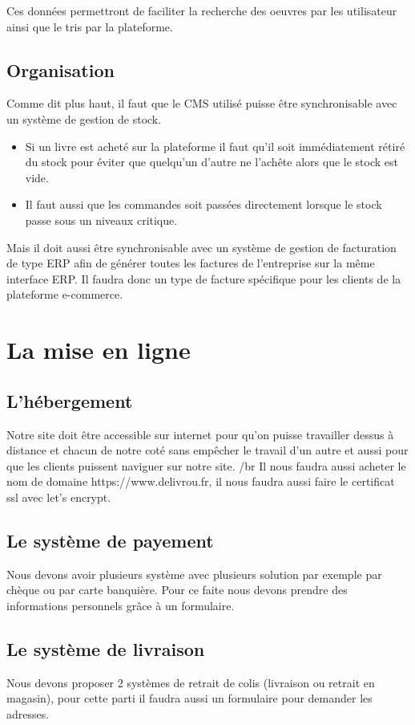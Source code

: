 \documentclass[a4paper,12pt]{report}
\begin{document}
Ces données permettront de faciliter la recherche des oeuvres par les utilisateur
ainsi que le tris par la plateforme.

\section{Organisation}
Comme dit plus haut, il faut que le CMS utilisé puisse être synchronisable avec
un système de gestion de stock.

\begin{itemize}
\item Si un livre est acheté sur la plateforme il faut qu'il soit immédiatement
  rétiré du stock pour éviter que quelqu'un d'autre ne l'achête alors que le
  stock est vide.
\item Il faut aussi que les commandes soit passées directement lorsque le stock
  passe sous un niveaux critique.
\end{itemize}
Mais il doit aussi être synchronisable avec un système de gestion de
facturation de type ERP afin de générer toutes les factures de l'entreprise sur
la même interface ERP. Il faudra donc un type de facture spécifique pour les
clients de la plateforme e-commerce.

\chapter{La mise en ligne}
\section{L'hébergement}
Notre site doit être accessible sur internet pour qu'on puisse travailler dessus
à distance et chacun de notre coté sans empêcher le travail d'un autre et aussi
pour que les clients puissent naviguer sur notre site. /br
Il nous faudra aussi acheter le nom de domaine https://www.delivrou.fr, il nous faudra
aussi faire le certificat ssl avec let's encrypt.

\section{Le système de payement}
Nous devons avoir plusieurs système avec plusieurs solution par exemple par chèque ou par
carte banquière. Pour ce faite nous devons prendre des informations personnels grâce à un
formulaire.

\section{Le système de livraison}
Nous devons proposer 2 systèmes de retrait de colis (livraison ou retrait en magasin), pour
cette parti il faudra aussi un formulaire pour demander les adresses.
\end{document}
